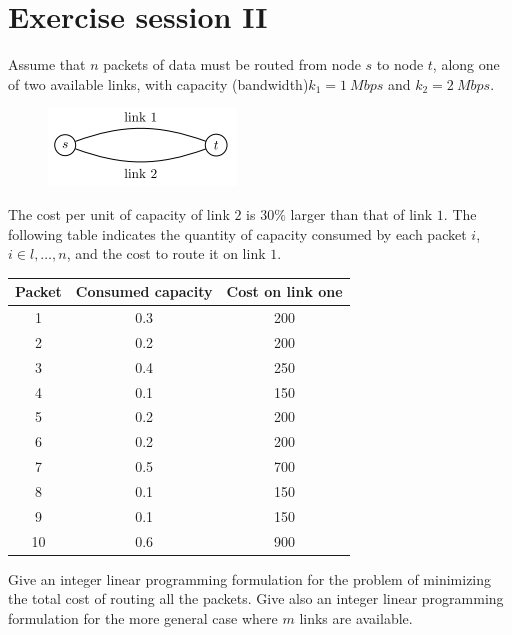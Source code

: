 \documentclass[12pt, a4paper]{report}
\newtheorem[style=M,bodystyle=\normalfont]{theorem}{Theorem}
\newtheorem[style=M,bodystyle=\normalfont]{corollary}{Corollary}
\newtheorem[style=M,bodystyle=\normalfont]{lemma}{Lemma}
\newtheorem[style=M,bodystyle=\normalfont]{definition}{Definition}
\begin{document}
\chapter{Exercise session II}
    \begin{Exercise}[label=3]
        Assume that $n$ packets of data must be routed from node $s$ to node $t$, along one of two available links, with capacity (bandwidth)$ k_1 = 1 \: Mbps$ and $k_2 = 2 \: Mbps$. 
        \begin{figure}[H]
            \centering
            \includegraphics[width=0.3\linewidth]{images/link.png}
        \end{figure}
        The cost per unit of capacity of link $2$ is $30\%$ larger than that of link $1$. The following table indicates the quantity of capacity consumed by each packet 
        $i$, $i \in {l,\dots,n}$, and the cost to route it on link $1$. 
        \begin{table}[H]
            \centering
            \begin{tabular}{c|cc}
            \textbf{Packet} & \textbf{Consumed capacity} & \textbf{Cost on link one} \\ \hline
            1               & 0.3                        & 200                       \\
            2               & 0.2                        & 200                       \\
            3               & 0.4                        & 250                       \\
            4               & 0.1                        & 150                       \\
            5               & 0.2                        & 200                       \\
            6               & 0.2                        & 200                       \\
            7               & 0.5                        & 700                       \\
            8               & 0.1                        & 150                       \\
            9               & 0.1                        & 150                       \\
            10              & 0.6                        & 900                      
            \end{tabular}
        \end{table}
        Give an integer linear programming formulation for the problem of minimizing the total cost of routing all the packets. Give also an integer linear programming formulation for 
        the more general case where $m$ links are available. 
    \end{Exercise}
\end{document}
